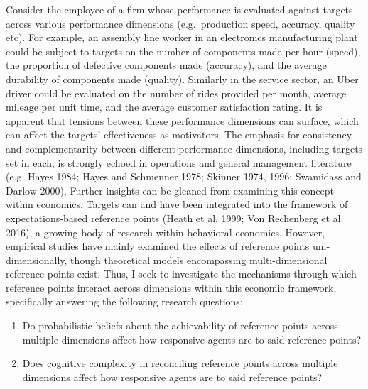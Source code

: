 \documentclass[
  12,
  letterpaper,
  DIV=11,
  numbers=noendperiod]{scrartcl}
\providecommand{\tightlist}{%
  \setlength{\itemsep}{0pt}\setlength{\parskip}{0pt}}
\begin{document}
Consider the employee of a firm whose performance is evaluated against
targets across various performance dimensions (e.g.~production speed,
accuracy, quality etc). For example, an assembly line worker in an
electronics manufacturing plant could be subject to targets on the
number of components made per hour (speed), the proportion of defective
components made (accuracy), and the average durability of components
made (quality). Similarly in the service sector, an Uber driver could be
evaluated on the number of rides provided per month, average mileage per
unit time, and the average customer satisfaction rating. It is apparent
that tensions between these performance dimensions can surface, which
can affect the targets' effectiveness as motivators. The emphasis for
consistency and complementarity between different performance
dimensions, including targets set in each, is strongly echoed in
operations and general management literature (e.g. Hayes 1984; Hayes and
Schmenner 1978; Skinner 1974, 1996; Swamidass and Darlow 2000). Further
insights can be gleaned from examining this concept within economics.
Targets can and have been integrated into the framework of
expectations-based reference points (Heath et al. 1999; Von Rechenberg
et al. 2016), a growing body of research within behavioral economics.
However, empirical studies have mainly examined the effects of reference
points uni-dimensionally, though theoretical models encompassing
multi-dimensional reference points exist. Thus, I seek to investigate
the mechanisms through which reference points interact across dimensions
within this economic framework, specifically answering the following
research questions:

\begin{enumerate}
\def\labelenumi{\arabic{enumi}.}
\tightlist
\item
  Do probabilistic beliefs about the achievability of reference points
  across multiple dimensions affect how responsive agents are to said
  reference points?
\item
  Does cognitive complexity in reconciling reference points across
  multiple dimensions affect how responsive agents are to said reference
  points?
\end{enumerate}
\end{document}
